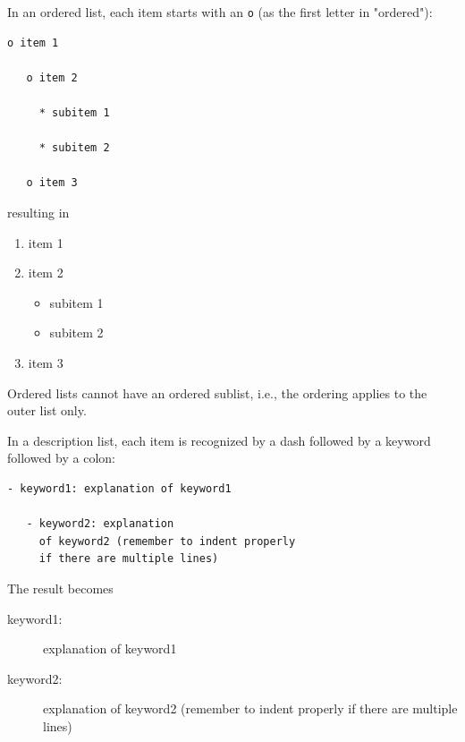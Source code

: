 \documentclass{article}
\begin{document}
\noindent
In an ordered list, each item starts with an {\fontsize{10pt}{10pt}\verb!o!} (as the first letter 
in "ordered"):
\begin{Verbatim}[fontsize=\fontsize{9pt}{9pt},tabsize=8,baselinestretch=0.85,
fontfamily=tt,xleftmargin=7mm]
   o item 1

   o item 2

     * subitem 1

     * subitem 2

   o item 3
\end{Verbatim}
\noindent

resulting in

\begin{enumerate}
  \item item 1

  \item item 2
\begin{itemize}

     \item subitem 1

     \item subitem 2

\end{itemize}

\noindent
  \item item 3
\end{enumerate}

\noindent
Ordered lists cannot have an ordered sublist, i.e., the ordering 
applies to the outer list only.

In a description list, each item is recognized by a dash followed
by a keyword followed by a colon:
\begin{Verbatim}[fontsize=\fontsize{9pt}{9pt},tabsize=8,baselinestretch=0.85,
fontfamily=tt,xleftmargin=7mm]
   - keyword1: explanation of keyword1

   - keyword2: explanation
     of keyword2 (remember to indent properly
     if there are multiple lines)
\end{Verbatim}
\noindent

The result becomes

\begin{description}
   \item[keyword1:] 
     explanation of keyword1

   \item[keyword2:] 
     explanation
     of keyword2 (remember to indent properly
     if there are multiple lines)
\end{description}
\end{document}
